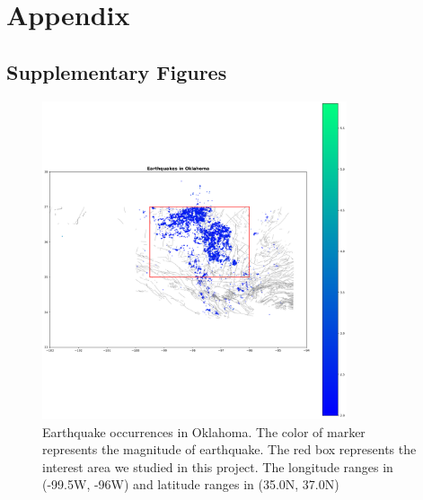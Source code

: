 \documentclass[final-report]{report-template}
\begin{document}
\newpage


\newpage
\section*{Appendix}
\subsection{Supplementary Figures}

\begin{figure}[H]
    \begin{center}
        \includegraphics[width=0.8\textwidth]{earthquake_plot.png}
    \end{center}
    \caption{\label{fig:earthquake_plot} Earthquake occurrences in Oklahoma. The color of marker represents the magnitude of earthquake. The red box represents the interest area we studied in this project. The longitude ranges in (-99.5W, -96W) and latitude ranges in (35.0N, 37.0N)}
\end{figure}

\end{document}
